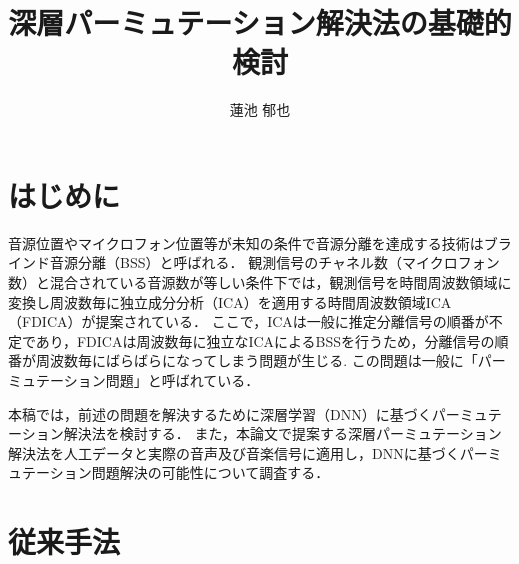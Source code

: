 \documentclass[a4j]{jsarticle}
\title{深層パーミュテーション解決法の基礎的検討}
\author{蓮池 郁也}
\begin{document}
\maketitle%



\thispagestyle{empty}
\pagestyle{empty}

\section{はじめに}
音源位置やマイクロフォン位置等が未知の条件で音源分離を達成する技術はブラインド音源分離（BSS）と呼ばれる．
観測信号のチャネル数（マイクロフォン数）と混合されている音源数が等しい条件下では，観測信号を時間周波数領域に変換し周波数毎に独立成分分析（ICA）\cite{ICA}を適用する時間周波数領域ICA（FDICA）\cite{FDICA}が提案されている．
ここで，ICAは一般に推定分離信号の順番が不定であり，FDICAは周波数毎に独立なICAによるBSSを行うため，分離信号の順番が周波数毎にばらばらになってしまう問題が生じる.
この問題は一般に「パーミュテーション問題」と呼ばれている．

本稿では，前述の問題を解決するために深層学習（DNN）に基づくパーミュテーション解決法を検討する．
また，本論文で提案する深層パーミュテーション解決法を人工データと実際の音声及び音楽信号に適用し，DNNに基づくパーミュテーション問題解決の可能性について調査する．

\section{従来手法}

\end{document}
